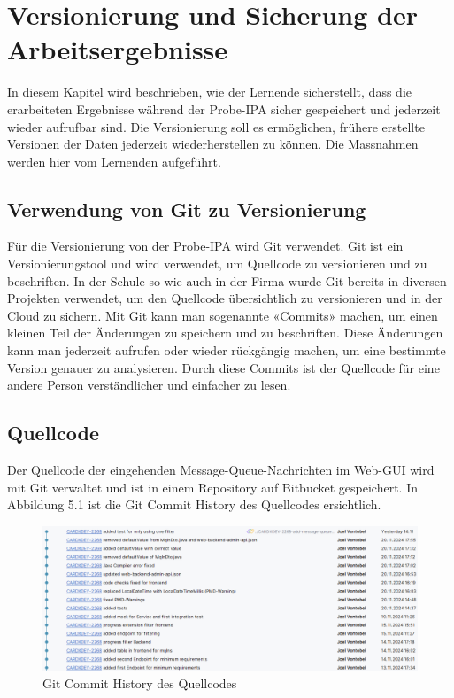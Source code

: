 \chapter{Versionierung und Sicherung der Arbeitsergebnisse}\label{ch:versionierung-und-sicherung-der-arbeitsergebnisse}
In diesem Kapitel wird beschrieben, wie der Lernende sicherstellt, dass die erarbeiteten Ergebnisse während der Probe-IPA sicher gespeichert und jederzeit wieder aufrufbar sind. Die Versionierung soll es ermöglichen, frühere erstellte Versionen der Daten jederzeit wiederherstellen zu können. Die Massnahmen werden hier vom Lernenden aufgeführt.

\section{Verwendung von Git zu Versionierung}
Für die Versionierung von der Probe-IPA wird Git verwendet. Git ist ein Versionierungstool und wird verwendet, um Quellcode zu versionieren und zu beschriften. In der Schule so wie auch in der Firma wurde Git bereits in diversen Projekten verwendet, um den Quellcode übersichtlich zu versionieren und in der Cloud zu sichern. Mit Git kann man sogenannte «Commits» machen, um einen kleinen Teil der Änderungen zu speichern und zu beschriften. Diese Änderungen kann man jederzeit aufrufen oder wieder rückgängig machen, um eine bestimmte Version genauer zu analysieren. Durch diese Commits ist der Quellcode für eine andere Person verständlicher und einfacher zu lesen.

\section{Quellcode}
Der Quellcode der eingehenden Message-Queue-Nachrichten im Web-GUI wird mit Git verwaltet und ist in einem Repository auf Bitbucket gespeichert. In Abbildung 5.1 ist die Git Commit History des Quellcodes ersichtlich.

\begin{figure}[H]
	\begin{center}
		\includegraphics[width=\textwidth]{ressourcen/commit-log-implementierung}
		\caption[Git Commit History des Quellcodes]{Git Commit History des Quellcodes}\label{fig:Git-Commit-History-des-Quellcodes}
	\end{center}
\end{figure}

